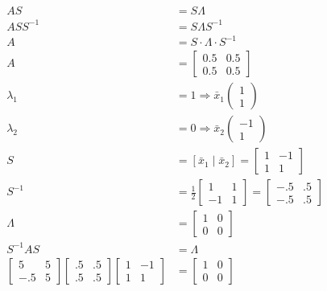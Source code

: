 \documentclass[main.tex]{subfiles}
\begin{document}
    $$
    \begin{aligned}
    AS &= S \Lambda\\
    A S S^{-1} &= S \Lambda S^{-1}\\
    A &= S \cdot \Lambda \cdot S^{-1}\\
    A &= \left[\begin{array}{ll}
    0.5 & 0.5 \\
    0.5 & 0.5
    \end{array}\right]\\
    \lambda_{1} &= 1 \Rightarrow \bar{x}_{1}\left(\begin{array}{c}
    1 \\
    1
    \end{array}\right)\\
    \lambda_{2} &= 0 \Rightarrow \bar{x}_{2}\left(\begin{array}{c}
    -1 \\
    1
    \end{array}\right)\\
    S &= \left[\bar{x}_{1} \mid \bar{x}_{2}\right] =\left[\begin{array}{cc}
    1 & -1 \\
    1 & 1
    \end{array}\right]\\
    S^{-1} &= \frac{1}{2}\left[\begin{array}{cc}
    1 & 1 \\
    -1 & 1
    \end{array}\right]=\left[\begin{array}{cc}
    -.5 & .5 \\
    -.5 & .5
    \end{array}\right]\\
    \Lambda &= \left[\begin{array}{ll}
    1 & 0 \\
    0 & 0
    \end{array}\right]\\
    S^{-1} A S &= \Lambda\\
    \left[\begin{array}{cc}
    5 & 5 \\
    -.5 & 5
    \end{array}\right]\left[\begin{array}{cc}
    .5 & .5 \\
    .5 & .5
    \end{array}\right]\left[\begin{array}{cc}
    1 & -1 \\
    1 & 1
    \end{array}\right]&=\left[\begin{array}{ll}
    1 & 0 \\
    0 & 0
    \end{array}\right]
    \end{aligned}
    $$
\end{document}
